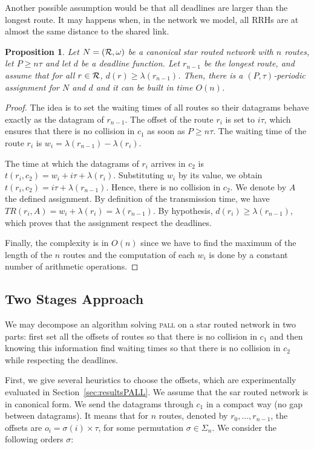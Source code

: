 \documentclass[a4paper,10pt]{article}
\newtheorem{proposition}{Proposition}
\newcommand\pall{\textsc{pall}\xspace}
\begin{document}
	Another possible assumption would be that all deadlines are larger than the longest route. It may happens when, in the network we model, all RRHs are at almost the same distance to the shared link.

	 \begin{proposition}\label{prop:asym}
	Let $N = ({\cal R}, \omega)$ be a canonical star routed network with $n$ routes, let $P \geq n\tau$ and let $d$ be a deadline function. Let $r_{n-1}$ be the longest route, and assume that for all $r\in {\cal R}$, $d(r) \geq \lambda(r_{n-1})$. Then, there is a $(P,\tau)$-periodic assignment for $N$ and $d$ and it can be built in time $O(n)$.
	 \end{proposition}
      \begin{proof}
       The idea is to set the waiting times of all routes so their datagrams behave exactly as the datagram of $r_{n-1}$. The offset of the route $r_i$ is set to $i\tau$, which ensures that there is no collision in $c_1$ as soon as $P \geq n\tau$. The waiting time of the route $r_i$ is $w_i = \lambda(r_{n-1}) - \lambda(r_{i})$.
        
    The time at which the datagrams of $r_i$ arrives in $c_2$ is $t(r_i, c_2) = w_i + i\tau + \lambda(r_{i})$. Substituting $w_i$ by its value, we obtain $t(r_i, c_2) =  i\tau + \lambda(r_{n-1})$.
    Hence, there is no collision in $c_2$. We denote by $A$ the defined assignment. By definition of the transmission time, we have $TR(r_i,A) = w_i + \lambda(r_i) = \lambda(r_{n-1})$. By hypothesis, $d(r_i) \geq \lambda(r_{n-1})$, which proves that the assignment respect the deadlines.

	Finally, the complexity is in $O(n)$ since we have to find the maximum of the length of the $n$ routes and the computation of each $w_i$ is done by a constant number of arithmetic operations.
     \end{proof}
     
    
     \subsection{Two Stages Approach}
     
      We may decompose an algorithm solving \pall on a star routed network in two parts: first set all the offsets of routes so that there is no collision in $c_1$ and then knowing this information find waiting times so that there is no collision in $c_2$ while respecting the deadlines. 
      
     First, we give several heuristics to choose the offsets, which are experimentally evaluated in Section~\ref{sec:resultsPALL}. We assume that the sar routed network is in canonical form. 
      We send the datagrams through $c_1$ in a compact way (no gap between datagrams). It means that for $n$ routes, denoted by $r_0, \dots, r_{n-1}$, the offsets are $o_i = \sigma(i) \times \tau$, for some permutation $\sigma \in \Sigma_n$. We consider the following orders $\sigma$: 
	
\end{document}
